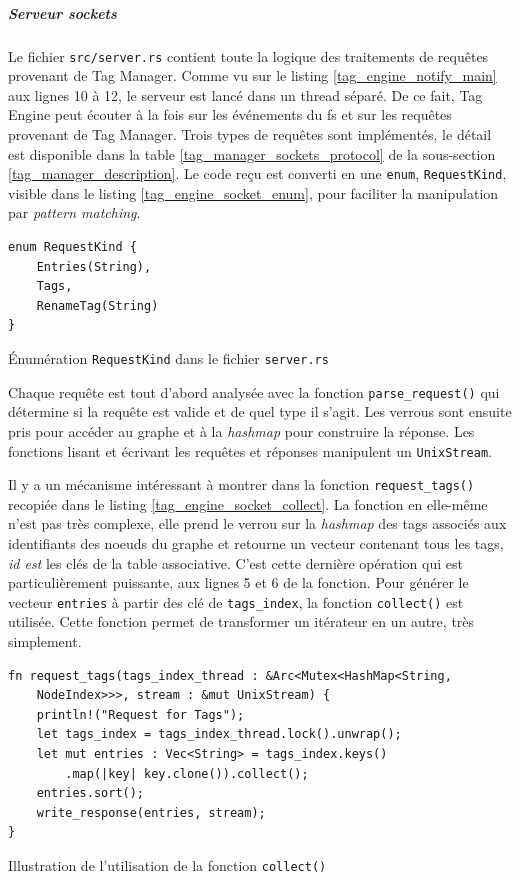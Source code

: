 \newpage
\subparagraph{Serveur sockets}\label{tag_engine_socket}
Le fichier \texttt{src/server.rs} contient toute la logique des traitements de requêtes 
provenant de Tag Manager. Comme vu sur le listing \ref{tag_engine_notify_main} aux lignes 10 à 12, 
le serveur est lancé dans un thread séparé. De ce fait, Tag Engine peut écouter à la fois sur les 
événements du \acrshort{fs} et sur les requêtes provenant de Tag Manager. Trois types de requêtes 
sont implémentés, le détail est disponible dans la table \ref{tag_manager_sockets_protocol} de la 
sous-section \ref{tag_manager_description}. Le code reçu est converti en une \texttt{enum}, 
\texttt{RequestKind}, visible dans le listing \ref{tag_engine_socket_enum}, pour faciliter 
la manipulation par \textit{pattern matching}.
\bigbreak
\begin{code}
    \begin{verbatim}
enum RequestKind {
    Entries(String),
    Tags,
    RenameTag(String)
}
    \end{verbatim}
    \caption{Énumération \texttt{RequestKind} dans le fichier \texttt{server.rs}}
    \label{tag_engine_socket_enum}
\end{code}
\bigbreak
Chaque requête est tout d'abord analysée avec la 
fonction \texttt{parse_request()} qui détermine si la requête est valide et de quel type 
il s'agit. Les verrous sont ensuite pris pour accéder au graphe et à la \textit{hashmap} pour 
construire la réponse. Les fonctions lisant et écrivant les requêtes et réponses manipulent un 
\texttt{UnixStream}. 

Il y a un mécanisme intéressant à montrer dans la fonction 
\texttt{request_tags()} recopiée dans le listing \ref{tag_engine_socket_collect}. La 
fonction en elle-même n'est pas très complexe, elle prend le verrou sur la \textit{hashmap} des 
tags associés aux identifiants des noeuds du graphe et retourne un vecteur contenant tous les tags, 
\textit{id est} les clés de la table associative. C'est cette dernière opération qui est 
particulièrement puissante, aux lignes 5 et 6 de la fonction. Pour générer le vecteur 
\texttt{entries} à partir des clé de \texttt{tags_index}, la fonction 
\texttt{collect()} est utilisée. Cette fonction permet de transformer un itérateur en 
un autre, très simplement.
\bigbreak
\begin{code}
    \begin{verbatim}
fn request_tags(tags_index_thread : &Arc<Mutex<HashMap<String, 
    NodeIndex>>>, stream : &mut UnixStream) {
    println!("Request for Tags");
    let tags_index = tags_index_thread.lock().unwrap();
    let mut entries : Vec<String> = tags_index.keys()
        .map(|key| key.clone()).collect();
    entries.sort();
    write_response(entries, stream);
}
    \end{verbatim}
    \caption{Illustration de l'utilisation de la fonction \texttt{collect()}}
    \label{tag_engine_socket_collect}
\end{code}
\bigbreak

